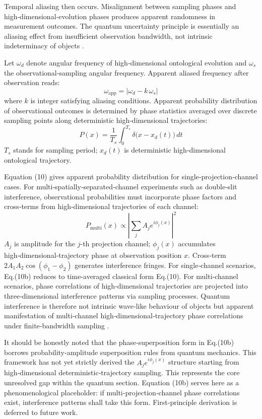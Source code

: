 \documentclass[12pt,a4paper]{article}
\begin{document}
Temporal aliasing then occurs. Misalignment between sampling phases and high‑dimensional‑evolution phases produces apparent randomness in measurement outcomes. The quantum uncertainty principle is essentially an aliasing effect from insufficient observation bandwidth, not intrinsic indeterminacy of objects \cite{shannon1949,zeilinger2000}.

Let $\omega_d$ denote angular frequency of high‑dimensional ontological evolution and $\omega_s$ the observational‑sampling angular frequency. Apparent aliased frequency after observation reads:
\begin{equation}
\omega_{\text{app}}=\left|\omega_d - k\,\omega_s\right|
\end{equation}
where $k$ is integer satisfying aliasing conditions. Apparent probability distribution of observational outcomes is determined by phase statistics averaged over discrete sampling points along deterministic high‑dimensional trajectories:
\begin{equation}
P(x)=\frac{1}{T_s}\int_{0}^{T_s}\delta\big(x-x_d(t)\big)\,dt
\end{equation}
$T_s$ stands for sampling period; $x_d(t)$ is deterministic high‑dimensional ontological trajectory.

Equation (10) gives apparent probability distribution for single‑projection‑channel cases. For multi‑spatially‑separated‑channel experiments such as double‑slit interference, observational probabilities must incorporate phase factors and cross‑terms from high‑dimensional trajectories of each channel:
\begin{equation*}
P_{\text{multi}}(x)\propto\left|\sum_j A_j e^{i\phi_j(x)}\right|^2
\tag{10b}
\end{equation*}
$A_j$ is amplitude for the $j$-th projection channel; $\phi_j(x)$ accumulates high‑dimensional‑trajectory phase at observation position $x$. Cross‑term $2A_1A_2\cos(\phi_1-\phi_2)$ generates interference fringes. For single‑channel scenarios, Eq.(10b) reduces to time‑averaged classical form Eq.(10). For multi‑channel scenarios, phase correlations of high‑dimensional trajectories are projected into three‑dimensional interference patterns via sampling processes. Quantum interference is therefore not intrinsic wave‑like behaviour of objects but apparent manifestation of multi‑channel high‑dimensional‑trajectory phase correlations under finite‑bandwidth sampling \cite{feynman1963,wheeler1983}.

It should be honestly noted that the phase‑superposition form in Eq.(10b) borrows probability‑amplitude superposition rules from quantum mechanics. This framework has not yet strictly derived the $A_j e^{i\phi_j(x)}$ structure starting from high‑dimensional deterministic‑trajectory sampling. This represents the core unresolved gap within the quantum section. Equation (10b) serves here as a phenomenological placeholder: if multi‑projection‑channel phase correlations exist, interference patterns shall take this form. First‑principle derivation is deferred to future work.
\end{document}
